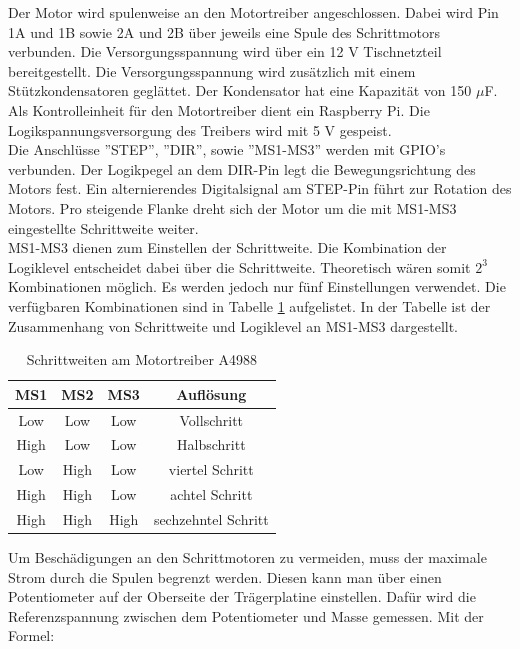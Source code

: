 Der Motor wird spulenweise an den Motortreiber angeschlossen. Dabei wird Pin 1A und 1B sowie 2A und 2B über jeweils eine Spule des Schrittmotors verbunden.
Die Versorgungsspannung wird über ein 12 V Tischnetzteil bereitgestellt. Die Versorgungsspannung wird zusätzlich mit einem Stützkondensatoren geglättet. Der Kondensator hat eine Kapazität von 150 $\mu$F.
Als Kontrolleinheit für den Motortreiber dient ein Raspberry Pi. Die Logikspannungsversorgung des Treibers wird mit 5 V gespeist.\\ 
Die Anschlüsse ''STEP'', ''DIR'', sowie ''MS1-MS3'' werden mit \ac{GPIO}’s verbunden. Der Logikpegel an dem DIR-Pin legt die Bewegungsrichtung des Motors fest. Ein alternierendes Digitalsignal am STEP-Pin führt zur Rotation des Motors. Pro steigende Flanke dreht sich der Motor um die mit MS1-MS3 eingestellte Schrittweite weiter. \\  
MS1-MS3 dienen zum Einstellen der Schrittweite. Die Kombination der Logiklevel entscheidet dabei über die Schrittweite. Theoretisch wären somit $2^{3}$ Kombinationen möglich. Es werden jedoch nur fünf Einstellungen verwendet. Die verfügbaren Kombinationen sind in Tabelle \ref{Mikrostepping} aufgelistet. In der Tabelle ist der Zusammenhang von Schrittweite und Logiklevel an MS1-MS3 dargestellt. 


\begin{table}[H]
	\centering
	\caption{Schrittweiten am Motortreiber A4988}
	\begin{tabular}{|c|c|c|c|}
		\hline
		\textbf{MS1} & \textbf{MS2}	& \textbf{MS3} 		& \textbf{Auflösung} \\ \hline
		Low & Low	& Low		& Vollschritt\\ \hline
		High & Low 	& Low  		& Halbschritt	\\ \hline
		Low & High  & Low 		& viertel Schritt 	\\ \hline
		High & High	& Low 		& achtel Schritt 	\\ \hline
		High & High	 &  High	& sechzehntel Schritt	\\\hline
	
	\end {tabular}
	\label{Mikrostepping}
\end{table}



Um Beschädigungen an den Schrittmotoren zu vermeiden, muss der maximale Strom durch die Spulen begrenzt werden. Diesen kann man über einen Potentiometer auf der Oberseite der Trägerplatine einstellen. Dafür wird die Referenzspannung zwischen dem Potentiometer und Masse gemessen. Mit der Formel: 

